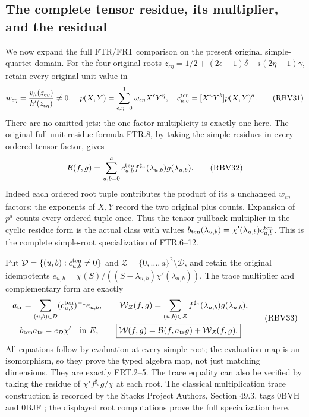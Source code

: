 \documentclass[11pt,a4paper]{article}
\begin{document}
\subsection{The complete tensor residue, its multiplier, and the residual}
We now expand the full FTR/FRT comparison on the present original
simple-quartet domain. For the four original roots
$z_{\epsilon\eta}=1/2+(2\epsilon-1)\delta+i(2\eta-1)\gamma$,
retain every original unit value in
\[
w_{\epsilon\eta}=\frac{v_h(z_{\epsilon\eta})}{h'(z_{\epsilon\eta})}\ne0,
\quad p(X,Y)=\sum_{\epsilon,\eta=0}^1w_{\epsilon\eta}X^\epsilon Y^\eta,
\quad c_{u,b}^{\rm ten}=[X^uY^b]p(X,Y)^a.
\tag{RBV31}
\]
There are no omitted jets: the one-factor multiplicity is exactly
one here. The original full-unit residue formula FTR.8, by taking
the simple residues in every ordered tensor factor, gives
\[
\mathcal B(f,g)=\sum_{u,b=0}^a
c_{u,b}^{\rm ten} f^{\sharp_a}(\lambda_{u,b})g(\lambda_{u,b}).
\tag{RBV32}
\]
Indeed each ordered root tuple contributes the product of its
$a$ unchanged $w_{\epsilon\eta}$ factors; the exponents of $X,Y$
record the two original plus counts. Expansion of $p^a$ counts
every ordered tuple once. Thus the tensor pullback multiplier in
the cyclic residue form is the actual class with values
$b_{\rm ten}(\lambda_{u,b})=\chi'(\lambda_{u,b})c_{u,b}^{\rm ten}$.
This is the complete simple-root specialization of FTR.6--12.

Put $\mathcal D=\{(u,b):c_{u,b}^{\rm ten}\ne0\}$ and
$\mathcal Z=\{0,\ldots,a\}^2\setminus\mathcal D$, and retain the
original idempotents
$e_{u,b}=\chi(S)/((S-\lambda_{u,b})\chi'(\lambda_{u,b}))$.
The trace multiplier and complementary form are exactly
\[
\begin{gathered}
a_{\rm tr}=\sum_{(u,b)\in\mathcal D}
              (c_{u,b}^{\rm ten})^{-1}e_{u,b},\qquad
\mathcal W_{\mathcal Z}(f,g)=\sum_{(u,b)\in\mathcal Z}
              f^{\sharp_a}(\lambda_{u,b})g(\lambda_{u,b}),\\
b_{\rm ten}a_{\rm tr}=e_{\mathcal D}\chi'\quad\text{in }E,
\qquad
\boxed{\mathcal W(f,g)=\mathcal B(f,a_{\rm tr}g)
                              +\mathcal W_{\mathcal Z}(f,g).}
\end{gathered}\tag{RBV33}
\]
All equations follow by evaluation at every simple root; the
evaluation map is an isomorphism, so they prove the typed algebra
map, not just matching dimensions. They are exactly FRT.2--5.
The trace equality can also be verified by taking the residue of
$\chi'f^{\sharp_a}g/\chi$ at each root. The classical multiplication
trace construction is recorded by the Stacks Project Authors,
Section 49.3, tags 0BVH and 0BJF \cite{a03rp:human:stacks-trace}; the
displayed root computations prove the full specialization here.
\end{document}

